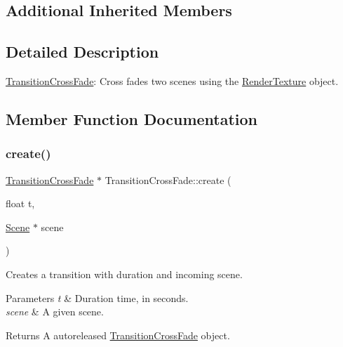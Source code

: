 \subsection*{Additional Inherited Members}


\subsection{Detailed Description}
\hyperlink{classTransitionCrossFade}{Transition\+Cross\+Fade}\+: Cross fades two scenes using the \hyperlink{classRenderTexture}{Render\+Texture} object. 

\subsection{Member Function Documentation}
\mbox{\label{classTransitionCrossFade_a5bf21ab9441cfcfbfb8df4eefff2c4bb}} 
\subsubsection{\texorpdfstring{create()}{create()}\hspace{0.1cm}{\footnotesize\ttfamily [1/2]}}
{\footnotesize\ttfamily \hyperlink{classTransitionCrossFade}{Transition\+Cross\+Fade} $\ast$ Transition\+Cross\+Fade\+::create (\begin{DoxyParamCaption}\item[{float}]{t,  }\item[{\hyperlink{classScene}{Scene} $\ast$}]{scene }\end{DoxyParamCaption})\hspace{0.3cm}{\ttfamily [static]}}

Creates a transition with duration and incoming scene.


\begin{DoxyParams}{Parameters}
{\em t} & Duration time, in seconds. \\
\hline
{\em scene} & A given scene. \\
\hline
\end{DoxyParams}
\begin{DoxyReturn}{Returns}
A autoreleased \hyperlink{classTransitionCrossFade}{Transition\+Cross\+Fade} object. 
\end{DoxyReturn}
\mbox{\label{classTransitionCrossFade_a49e0224a50db3295b86cde042c084848}} 
